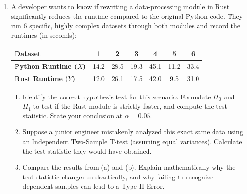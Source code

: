 \documentclass{article}
\begin{document}
\begin{enumerate}
    \item A developer wants to know if rewriting a data-processing module in Rust significantly reduces the runtime compared to the original Python code. They run $6$ specific, highly complex datasets through both modules and record the runtimes (in seconds):
    
    \begin{table}[h]
    \centering
    \begin{tabular}{lcccccc}
    \hline
    \textbf{Dataset} & \textbf{1} & \textbf{2} & \textbf{3} & \textbf{4} & \textbf{5} & \textbf{6} \\ \hline
    \textbf{Python Runtime ($X$)} & 14.2 & 28.5 & 19.3 & 45.1 & 11.2 & 33.4 \\
    \textbf{Rust Runtime ($Y$)}   & 12.0 & 26.1 & 17.5 & 42.0 & 9.5 & 31.0 \\ \hline
    \end{tabular}
    \end{table}
    
    \begin{enumerate}
        \item Identify the correct hypothesis test for this scenario. Formulate $H_0$ and $H_1$ to test if the Rust module is strictly faster, and compute the test statistic. State your conclusion at $\alpha = 0.05$.
        \item Suppose a junior engineer mistakenly analyzed this exact same data using an Independent Two-Sample T-test (assuming equal variances). Calculate the test statistic they would have obtained. 
        \item Compare the results from (a) and (b). Explain mathematically why the test statistic changes so drastically, and why failing to recognize dependent samples can lead to a Type II Error.
    \end{enumerate}

\end{enumerate}
\end{document}
